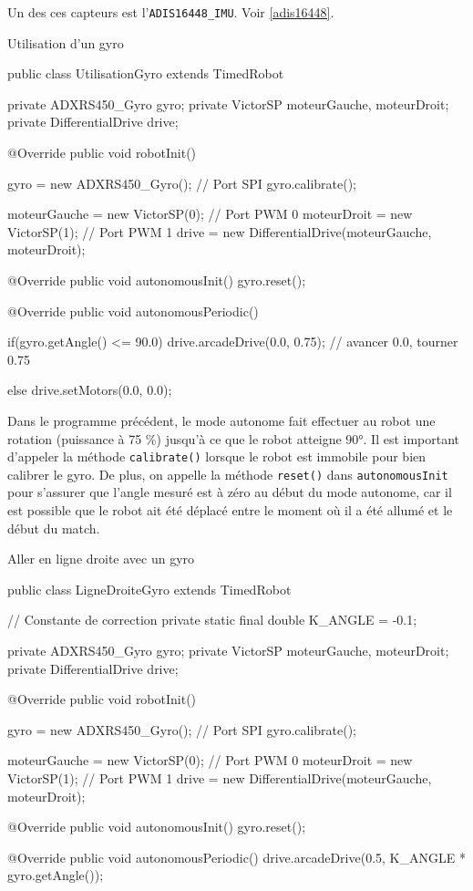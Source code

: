 \documentclass[12pt]{report}
\begin{document}
Un des ces capteurs est l'\texttt{ADIS16448\_IMU}. Voir \ref{adis16448}.

\begin{MyTCB}{Utilisation d'un gyro}

public class UtilisationGyro extends TimedRobot {

	private ADXRS450_Gyro gyro;
	private VictorSP moteurGauche, moteurDroit;
	private DifferentialDrive drive;
	
	@Override
	public void robotInit() {
	
		gyro = new ADXRS450_Gyro(); // Port SPI
		gyro.calibrate();

		moteurGauche = new VictorSP(0); // Port PWM 0
		moteurDroit = new VictorSP(1); // Port PWM 1
		drive = new DifferentialDrive(moteurGauche, moteurDroit);

	}
	
	@Override
	public void autonomousInit() {
		gyro.reset();
	}
	
	@Override
	public void autonomousPeriodic() {

		if(gyro.getAngle() <= 90.0)
			drive.arcadeDrive(0.0, 0.75); // avancer 0.0, tourner 0.75
			
		else
			drive.setMotors(0.0, 0.0);		
		
	}

}

\end{MyTCB}

Dans le programme précédent, le mode autonome fait effectuer au robot une rotation (puissance à 75 \%) jusqu'à ce que le robot atteigne 90°. Il est important d'appeler la méthode \texttt{calibrate()} lorsque le robot est immobile pour bien calibrer le gyro. De plus, on appelle la méthode \texttt{reset()} dans \texttt{autonomousInit} pour s'assurer que l'angle mesuré est à zéro au début du mode autonome, car il est possible que le robot ait été déplacé entre le moment où il a été allumé et le début du match.

\begin{MyTCB}{Aller en ligne droite avec un gyro}

public class LigneDroiteGyro extends TimedRobot {

	// Constante de correction
	private static final double K_ANGLE = -0.1; 

	private ADXRS450_Gyro gyro;
	private VictorSP moteurGauche, moteurDroit;
	private DifferentialDrive drive;
	
	@Override
	public void robotInit() {
	
		gyro = new ADXRS450_Gyro(); // Port SPI
		gyro.calibrate();

		moteurGauche = new VictorSP(0); // Port PWM 0
		moteurDroit = new VictorSP(1); // Port PWM 1
		drive = new DifferentialDrive(moteurGauche, moteurDroit);

	}
	
	@Override
	public void autonomousInit() {
		gyro.reset();
	}
	
	@Override
	public void autonomousPeriodic() {
		drive.arcadeDrive(0.5, K_ANGLE * gyro.getAngle());
	}

}
\end{MyTCB}
\end{document}
